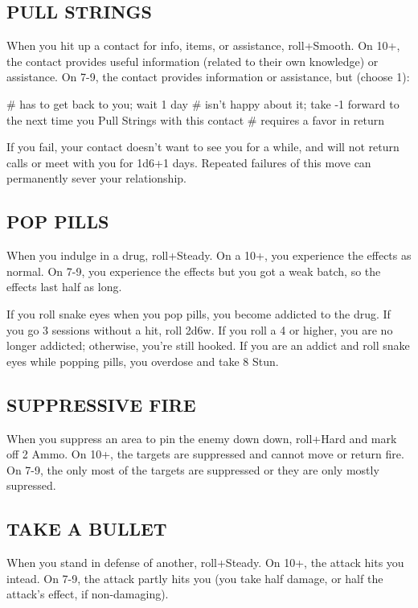 \subsection{PULL STRINGS}
When you hit up a contact for info, items, or assistance, roll+Smooth. On 10+, the contact provides useful information (related to their own knowledge) or assistance. On 7-9, the contact provides information or assistance, but (choose 1):

\begin{easylist}
# has to get back to you; wait 1 day
# isn’t happy about it; take -1 forward to the next time you Pull Strings with this contact
# requires a favor in return
\end{easylist}

If you fail, your contact doesn’t want to see you for a while, and will not return calls or meet with you for 1d6+1 days. Repeated failures of this move can permanently sever your relationship.


\subsection{POP PILLS}
When you indulge in a drug, roll+Steady. On a 10+, you experience the effects as normal. On 7-9, you experience the effects but you got a weak batch, so the effects last half as long.

If you roll snake eyes when you pop pills, you become addicted to the drug. If you go 3 sessions without a hit, roll 2d6w. If you roll a 4 or higher, you are no longer addicted; otherwise, you’re still hooked. If you are an addict and roll snake eyes while popping pills, you overdose and take 8 Stun.


\subsection{SUPPRESSIVE FIRE}
When you suppress an area to pin the enemy down down, roll+Hard and mark off 2 Ammo. On 10+, the targets are suppressed and cannot move or return fire. On 7-9, the only most of the targets are suppressed or they are only mostly supressed.


\subsection{TAKE A BULLET}
When you stand in defense of another, roll+Steady. On 10+, the attack hits you intead. On 7-9, the attack partly hits you (you take half damage, or half the attack’s effect, if non-damaging).


